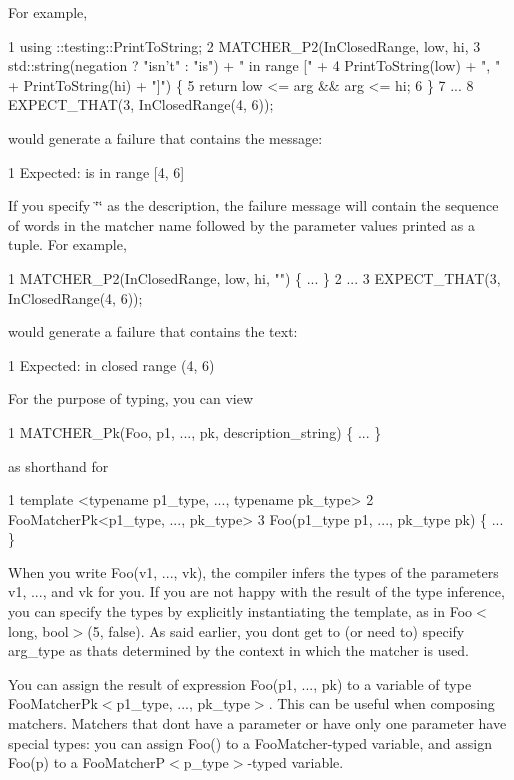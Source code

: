 For example, 
\begin{DoxyCode}
1 using ::testing::PrintToString;
2 MATCHER\_P2(InClosedRange, low, hi,
3            std::string(negation ? "isn't" : "is") + " in range [" +
4            PrintToString(low) + ", " + PrintToString(hi) + "]") \{
5   return low <= arg && arg <= hi;
6 \}
7 ...
8 EXPECT\_THAT(3, InClosedRange(4, 6));
\end{DoxyCode}
 would generate a failure that contains the message\+: 
\begin{DoxyCode}
1 Expected: is in range [4, 6]
\end{DoxyCode}


If you specify {\ttfamily \char`\"{}\char`\"{}} as the description, the failure message will contain the sequence of words in the matcher name followed by the parameter values printed as a tuple. For example, 
\begin{DoxyCode}
1 MATCHER\_P2(InClosedRange, low, hi, "") \{ ... \}
2 ...
3 EXPECT\_THAT(3, InClosedRange(4, 6));
\end{DoxyCode}
 would generate a failure that contains the text\+: 
\begin{DoxyCode}
1 Expected: in closed range (4, 6)
\end{DoxyCode}


For the purpose of typing, you can view 
\begin{DoxyCode}
1 MATCHER\_Pk(Foo, p1, ..., pk, description\_string) \{ ... \}
\end{DoxyCode}
 as shorthand for 
\begin{DoxyCode}
1 template <typename p1\_type, ..., typename pk\_type>
2 FooMatcherPk<p1\_type, ..., pk\_type>
3 Foo(p1\_type p1, ..., pk\_type pk) \{ ... \}
\end{DoxyCode}


When you write {\ttfamily Foo(v1, ..., vk)}, the compiler infers the types of the parameters {\ttfamily v1}, ..., and {\ttfamily vk} for you. If you are not happy with the result of the type inference, you can specify the types by explicitly instantiating the template, as in {\ttfamily Foo$<$long, bool$>$(5, false)}. As said earlier, you don\textquotesingle{}t get to (or need to) specify {\ttfamily arg\+\_\+type} as that\textquotesingle{}s determined by the context in which the matcher is used.

You can assign the result of expression {\ttfamily Foo(p1, ..., pk)} to a variable of type {\ttfamily Foo\+Matcher\+Pk$<$p1\+\_\+type, ..., pk\+\_\+type$>$}. This can be useful when composing matchers. Matchers that don\textquotesingle{}t have a parameter or have only one parameter have special types\+: you can assign {\ttfamily Foo()} to a {\ttfamily Foo\+Matcher}-\/typed variable, and assign {\ttfamily Foo(p)} to a {\ttfamily Foo\+MatcherP$<$p\+\_\+type$>$}-\/typed variable.

